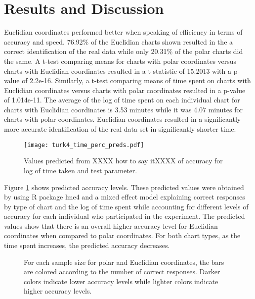 \section{Results and Discussion}

Euclidian coordinates performed better when speaking of efficiency in terms of accuracy and speed. 76.92\% of the Euclidian charts shown resulted in the a correct identification of the real data while only 20.31\% of the polar charts did the same. A t-test comparing means for charts with polar coordinates versus charts with Euclidian coordinates resulted in a t statistic of 15.2013 with a p-value of 2.2e-16. Similarly, a t-test comparing means of time spent on charts with Euclidian coordinates versus charts with polar coordinates resulted in a p-value of 1.014e-11. The average of the log of time spent on each individual chart for charts with Euclidian coordinates is 3.53 minutes while it was 4.07 minutes for charts with polar coordinates. Euclidian coordinates resulted in a significantly more accurate identification of the real data set in significantly shorter time. 

\begin{figure}[htbp] %
   \centering
   \texttt{[image: turk4\_time\_perc\_preds.pdf]}  
   \caption{Values predicted from XXXX how to say itXXXX of accuracy for log of time taken and test parameter.}
   \label{accuracy_preds}
\end{figure}

Figure \ref{accuracy_preds} shows predicted accuracy levels. These predicted values were obtained by using R package lme4 and a mixed effect model explaining correct responses by type of chart and the log of time spent while accounting for different levels of accuracy for each individual who participated in the experiment. The predicted values show that there is an overall higher accuracy level for Euclidian coordinates when compared to polar coordinates. For both chart types, as the time spent increases, the predicted accuracy decreases. 

\begin{figure}[htbp] %
   \centering
   \caption{For each sample size for polar and Euclidian coordinates, the bars are colored according to the number of correct responses. Darker colors indicate lower accuracy levels while lighter colors indicate higher accuracy levels. }
   \label{samp_size_acc}
\end{figure}

